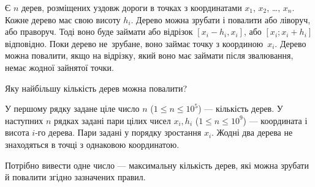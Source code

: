 ﻿Є $n$ дерев, розміщених уздовж дороги в точках з координатами $x_1$, $x_2$, \dots, $x_n$. Кожне дерево має свою висоту $h_i$. Дерево можна зрубати і повалити або ліворуч, або праворуч. Тоді воно буде займати або відрізок $[x_i - h_i, x_i]$, або $[x_i; x_i + h_i]$ відповідно. Поки дерево не~зрубане, воно займає точку з координою~$x_i$. Дерево можна повалити, якщо на відрізку, який воно має займати після звалювання, немає жодної зайнятої точки.

Яку найбільшу кількість дерев можна повалити?

\InputFile
У першому рядку задане ціле число $n$ ($1\leqslant n\leqslant 10^5$) --- кількість дерев.
У наступних $n$ рядках задані пари цілих чисел $x_i, h_i$ ($1\leqslant n\leqslant 10^9$) — координата і
висота $i$-го дерева.
Пари задані у порядку зростання $x_i$. Жодні два дерева не знаходяться в точці з однаковою
координатою.

\OutputFile
Потрібно вивести одне число --- максимальну кількість дерев, які можна зрубати й повалити згідно зазначених правил.

\Examples
\begin{example}
\end{example}